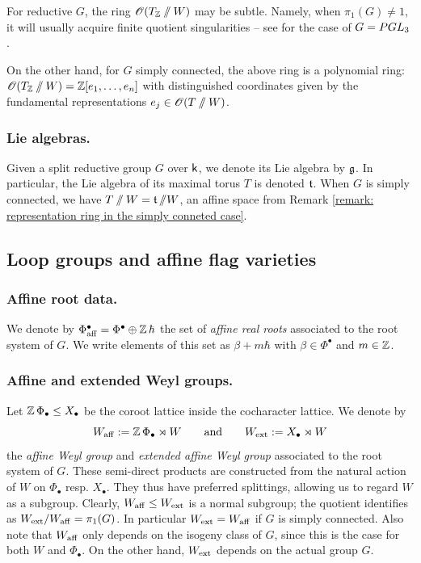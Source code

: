 \begin{remark}\label{remark: representation ring in the simply conneted case}
For reductive $G$, the ring $\operatorname{\mathscr{O}}(T_{\operatorname{\mathbb{Z}}} \sslash W)$ may be subtle. Namely, when $\pi_1(G) \neq 1$, it will usually acquire finite quotient singularities -- see \cite[\S 7]{BZ00} for the case of $G = PGL_3$.

On the other hand, for $G$ simply connected, the above ring is a polynomial ring: $\operatorname{\mathscr{O}}(T_{\operatorname{\mathbb{Z}}} \sslash W) = \operatorname{\mathbb{Z}}[e_1, \dots, e_n]$ with distinguished coordinates given by the fundamental representations $e_j \in \operatorname{\mathscr{O}}(T \sslash W)$.
\end{remark}


\subsubsection{Lie algebras.}
Given a split reductive group $G$ over $\mathsf{k}$, we denote its Lie algebra by $\operatorname{\mathfrak{g}}$. In particular, the Lie algebra of its maximal torus $T$ is denoted $\operatorname{\mathfrak{t}}$. When $G$ is simply connected, we have $T \sslash W = \operatorname{\mathfrak{t}} \sslash W$, an affine space from Remark \ref{remark: representation ring in the simply conneted case}.




\subsection{Loop groups and affine flag varieties}\label{section: loop groups and affine flag varieties}

\subsubsection{Affine root data.}
We denote by $\Phi^{\bullet}_{\mathrm{aff}} = \Phi^{\bullet} \oplus \operatorname{\mathbb{Z}}\hbar$ the set of {\it affine real roots} associated to the root system of $G$. We write elements of this set as $\beta + m \hbar$ with $\beta \in \Phi^{\bullet}$ and $m \in \operatorname{\mathbb{Z}}$.

\subsubsection{Affine and extended Weyl groups.}
Let $\operatorname{\mathbb{Z}}\Phi_{\bullet} \leq X_{\bullet}$ be the coroot lattice inside the cocharacter lattice.
We denote by
\begin{equation*}
W_{\mathrm{aff}} := \operatorname{\mathbb{Z}}\Phi_{\bullet} \rtimes W
\qquad
\text{and}
\qquad
W_{\mathrm{ext}} := X_{\bullet} \rtimes W
\end{equation*}
the \textit{affine Weyl group} and \textit{extended affine Weyl group} associated to the root system of $G$.
These semi-direct products are constructed from the natural action of $W$ on $\Phi_{\bullet}$ resp. $X_{\bullet}$. They thus have preferred splittings, allowing us to regard $W$ as a subgroup.
Clearly, $W_{\mathrm{aff}} \leq W_{\mathrm{ext}}$ is a normal subgroup; the quotient identifies as $W_{\mathrm{ext}} / W_{\mathrm{aff}} = \pi_1(G)$. In particular $W_{\mathrm{ext}} = W_{\mathrm{aff}}$ if $G$ is simply connected.
%
Also note that $W_{\mathrm{aff}}$ only depends on the isogeny class of $G$, since this is the case for both $W$ and $\Phi_{\bullet}$. On the other hand, $W_{\mathrm{ext}}$ depends on the actual group $G$.


